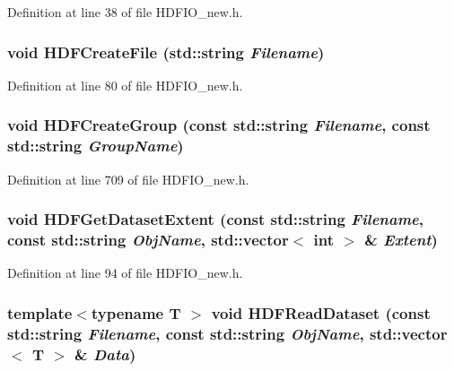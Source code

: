 Definition at line 38 of file HDFIO\_\-new.h.

\subsubsection[{HDFCreateFile}]{\setlength{\rightskip}{0pt plus 5cm}void HDFCreateFile (std::string {\em Filename})}\label{HDFIO__new_8h_aa4eeddaee70eb3ce64662c7d5a0e3687}


Definition at line 80 of file HDFIO\_\-new.h.

\subsubsection[{HDFCreateGroup}]{\setlength{\rightskip}{0pt plus 5cm}void HDFCreateGroup (const std::string {\em Filename}, \/  const std::string {\em GroupName})}\label{HDFIO__new_8h_adfafd5685316cd050ad282b7837e7f05}


Definition at line 709 of file HDFIO\_\-new.h.

\subsubsection[{HDFGetDatasetExtent}]{\setlength{\rightskip}{0pt plus 5cm}void HDFGetDatasetExtent (const std::string {\em Filename}, \/  const std::string {\em ObjName}, \/  std::vector$<$ int $>$ \& {\em Extent})}\label{HDFIO__new_8h_a285070bd55644602c9a8ac1830d44c39}


Definition at line 94 of file HDFIO\_\-new.h.

\subsubsection[{HDFReadDataset}]{\setlength{\rightskip}{0pt plus 5cm}template$<$typename T $>$ void HDFReadDataset (const std::string {\em Filename}, \/  const std::string {\em ObjName}, \/  std::vector$<$ T $>$ \& {\em Data})}\label{HDFIO__new_8h_aa9021278db454aa0b55e9d45db4d1732}



